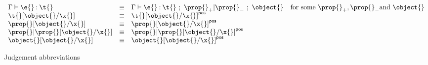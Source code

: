 \begin{figure*}
$$
\begin{array}{lllr}
  \judgementtwo{\propenv{}}{\e{}}{\t{}} &\equiv& 
  \judgement{\propenv{}}{\e{}}{\t{}}{\filterset{\thenprop{\prop{}}}{\elseprop{\prop{}}}}{\object{}}
  & \text{for some}\ {\thenprop{\prop{}}}, {\elseprop{\prop{}}} \text{and}\ {\object{}}

  \\
  {\replacefor{\t{}}{\object{}}{\x{}}} &\equiv& {\pluspolarity{\replacefor{\t{}}{\object{}}{\x{}}}}
  \\
  {\replacefor{\prop{}}{\object{}}{\x{}}} &\equiv&  {\pluspolarity{\replacefor{\prop{}}{\object{}}{\x{}}}}
  \\
  {\replacefor{\filterset{\prop{}}{\prop{}}}{\object{}}{\x{}}} &\equiv&  {\pluspolarity{\replacefor{\filterset{\prop{}}{\prop{}}}{\object{}}{\x{}}}}
  \\
  {\replacefor{\object{}}{\object{}}{\x{}}} &\equiv& {\pluspolarity{\replacefor{\object{}}{\object{}}{\x{}}}}

\end{array}
$$
\caption{Judgement abbreviations}
\end{figure*}
